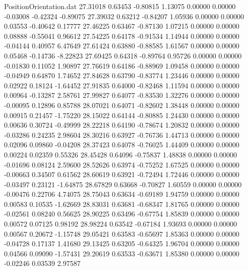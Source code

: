 \begin{filecontents}{PositionOrientation.dat}
  27.31018    0.63453   -0.80815     1.13075    0.00000    0.00000   -0.03008   -0.42324   -0.89075
  27.39032    0.63212   -0.84207     1.05936    0.00000    0.00000    0.03553   -0.40642    0.17777
  27.46225    0.63467   -0.87130     1.07215    0.00000    0.00000    0.08888   -0.55041    0.96612
  27.54225    0.64178   -0.91534     1.14944    0.00000    0.00000   -0.04144    0.40957    6.47649
  27.61424    0.63880   -0.88585     1.61567    0.00000    0.00000    0.05468   -0.14736   -8.22823
  27.69425    0.64318   -0.89764     0.95726    0.00000    0.00000   -0.01830    0.11052    1.90897
  27.76619    0.64186   -0.88969     1.09458    0.00000    0.00000   -0.04949    0.64870    1.74652
  27.84628    0.63790   -0.83774     1.23446    0.00000    0.00000    0.02922    0.18124   -1.64452
  27.91835    0.64000   -0.82468     1.11594    0.00000    0.00000    0.00964   -0.13287    2.58761
  27.99827    0.64077   -0.83530     1.32276    0.00000    0.00000   -0.00095    0.12896    0.85788
  28.07021    0.64071   -0.82602     1.38448    0.00000    0.00000    0.00915    0.21457   -1.75220
  28.15022    0.64144   -0.80885     1.24430    0.00000    0.00000    0.00636    0.30724   -0.49999
  28.22218    0.64190   -0.78674     1.20832    0.00000    0.00000   -0.03286    0.24235    2.98604
  28.30216    0.63927   -0.76736     1.44713    0.00000    0.00000    0.02096    0.09860   -0.04208
  28.37423    0.64078   -0.76025     1.44409    0.00000    0.00000    0.00224    0.02359    0.55326
  28.45428    0.64096   -0.75837     1.48838    0.00000    0.00000   -0.01696    0.08124    2.59600
  28.52626    0.63974   -0.75252     1.67525    0.00000    0.00000   -0.00663    0.34507    0.61562
  28.60619    0.63921   -0.72494     1.72446    0.00000    0.00000   -0.03497    0.23121   -1.64875
  28.67829    0.63668   -0.70827     1.60559    0.00000    0.00000   -0.00476    0.22706    4.74075
  28.75043    0.63634   -0.69189     1.94759    0.00000    0.00000    0.00583    0.10535   -1.62669
  28.83031    0.63681   -0.68347     1.81765    0.00000    0.00000   -0.02561    0.08240    0.56625
  28.90225    0.63496   -0.67754     1.85839    0.00000    0.00000    0.00572    0.07125    0.98192
  28.98224    0.63542   -0.67184     1.93693    0.00000    0.00000    0.00567    0.20672   -1.15748
  29.05421    0.63583   -0.65697     1.85363    0.00000    0.00000   -0.04728    0.17137    1.41680
  29.13425    0.63205   -0.64325     1.96704    0.00000    0.00000    0.04566    0.09090   -1.57431
  29.20619    0.63533   -0.63671     1.85380    0.00000    0.00000   -0.02246    0.03539    2.97587

\end{filecontents}
